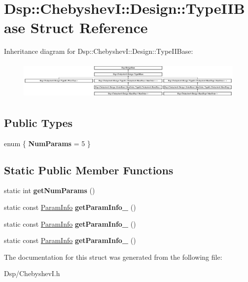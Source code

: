 \hypertarget{structDsp_1_1ChebyshevI_1_1Design_1_1TypeIIBase}{\section{Dsp\-:\-:Chebyshev\-I\-:\-:Design\-:\-:Type\-I\-I\-Base Struct Reference}
\label{structDsp_1_1ChebyshevI_1_1Design_1_1TypeIIBase}
}
Inheritance diagram for Dsp\-:\-:Chebyshev\-I\-:\-:Design\-:\-:Type\-I\-I\-Base\-:\begin{figure}[H]
\begin{center}
\leavevmode
\includegraphics[height=1.900883cm]{structDsp_1_1ChebyshevI_1_1Design_1_1TypeIIBase}
\end{center}
\end{figure}
\subsection*{Public Types}
\begin{DoxyCompactItemize}
\item 
enum \{ {\bfseries Num\-Params} =  5
 \}
\end{DoxyCompactItemize}
\subsection*{Static Public Member Functions}
\begin{DoxyCompactItemize}
\item 
\hypertarget{structDsp_1_1ChebyshevI_1_1Design_1_1TypeIIBase_a49c6b12c94effa13b235c643499e2394}{static int {\bfseries get\-Num\-Params} ()}\label{structDsp_1_1ChebyshevI_1_1Design_1_1TypeIIBase_a49c6b12c94effa13b235c643499e2394}

\item 
\hypertarget{structDsp_1_1ChebyshevI_1_1Design_1_1TypeIIBase_a74d7cd788344fe5e80dc3ac37c1317f0}{static const \hyperlink{classDsp_1_1ParamInfo}{Param\-Info} {\bfseries get\-Param\-Info\-\_} ()}\label{structDsp_1_1ChebyshevI_1_1Design_1_1TypeIIBase_a74d7cd788344fe5e80dc3ac37c1317f0}

\item 
\hypertarget{structDsp_1_1ChebyshevI_1_1Design_1_1TypeIIBase_a17e30e2bf493bec698e25b0fb542dda4}{static const \hyperlink{classDsp_1_1ParamInfo}{Param\-Info} {\bfseries get\-Param\-Info\-\_} ()}\label{structDsp_1_1ChebyshevI_1_1Design_1_1TypeIIBase_a17e30e2bf493bec698e25b0fb542dda4}

\item 
\hypertarget{structDsp_1_1ChebyshevI_1_1Design_1_1TypeIIBase_a2e66aa0b790c4ff3c833829c57d98ccc}{static const \hyperlink{classDsp_1_1ParamInfo}{Param\-Info} {\bfseries get\-Param\-Info\-\_} ()}\label{structDsp_1_1ChebyshevI_1_1Design_1_1TypeIIBase_a2e66aa0b790c4ff3c833829c57d98ccc}

\end{DoxyCompactItemize}


The documentation for this struct was generated from the following file\-:\begin{DoxyCompactItemize}
\item 
Dsp/Chebyshev\-I.\-h\end{DoxyCompactItemize}
